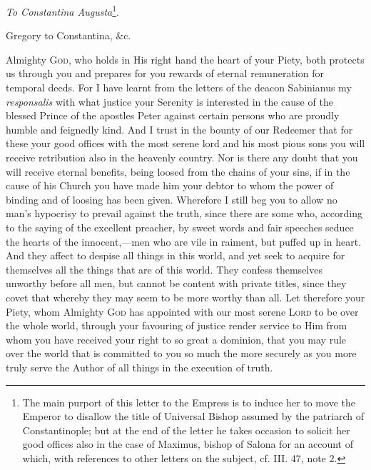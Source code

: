 
\emph{To Constantina Augusta}\footnote{The main purport of this letter to the Empress is to induce her to move the Emperor to disallow the title of Universal Bishop assumed by the patriarch of Constantinople; but at the end of the letter he takes occasion to solicit her good offices also in the case of Maximus, bishop of Salona for an account of which, with references to other letters on the subject, cf. III. 47, note 2.}.

Gregory to Constantina, \&c.

Almighty \textsc{God}, who holds in His right hand the heart of your Piety, both protects us through you and prepares for you rewards of eternal remuneration for temporal deeds. For I have learnt from the letters of the deacon Sabinianus my \emph{responsalis} with what justice your Serenity is interested in the cause of the blessed Prince of the apostles Peter against certain persons who are proudly humble and feignedly kind. And I trust in the bounty of our Redeemer that for these your good offices with the most serene lord and his most pious sons you will receive retribution also in the heavenly country. Nor is there any doubt that you will receive eternal benefits, being loosed from the chains of your sins, if in the cause of his Church you have made him your debtor to whom the power of binding and of loosing has been given. Wherefore I still beg you to allow no man’s hypocrisy to prevail against the truth, since there are some who, according to the saying of the excellent preacher, by sweet words and fair speeches seduce the hearts of the innocent,—men who are vile in raiment, but puffed up in heart. And they affect to despise all things in this world, and yet seek to acquire for themselves all the things that are of this world. They confess themselves unworthy before all men, but cannot be content with private titles, since they covet that whereby they may seem to be more worthy than all. Let therefore your Piety, whom Almighty \textsc{God} has appointed with our most serene \textsc{Lord} to be over the whole world, through your favouring of justice render service to Him from whom you have received your right to so great a dominion, that you may rule over the world that is committed to you so much the more securely as you more truly serve the Author of all things in the execution of truth.

